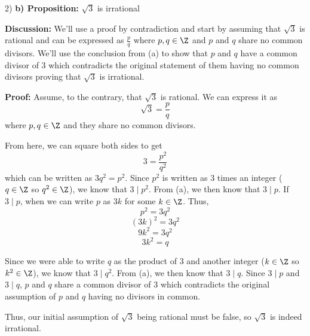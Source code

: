 \begin{paragraph}{2)}
        \textbf{b) Proposition:} $\sqrt{3}$ is irrational
        \spacing

        \textbf{Discussion:} We'll use a proof by contradiction and start
        by assuming that $\sqrt{3}$ is rational and can be expressed 
        as $\frac{p}{q}$ where $p, q \in \Z$ and $p$ and $q$ share no
        common divisors. We'll use the conclusion from (a) to show that 
        $p$ and $q$ have a common divisor of 3 which contradicts the original 
        statement of them having no common divisors proving that $\sqrt{3}$
        is irrational.
        \spacing

        \textbf{Proof:} Assume, to the contrary, that $\sqrt{3}$ is rational. We
        can express it as $$\sqrt{3} = \frac{p}{q}$$ where 
        $p, q \in \Z$ and they share no common divisors. 
        \spacing
        
        From here, we can square both sides to get $$3 = \frac{p^2}{q^2}$$ which can
        be written as $3q^2 = p^2$. Since $p^2$ is written as $3$ times
        an integer ($q \in \Z$ so $q^2 \in \Z$), we know that $3 \mid p^2$.
        From (a), we then know that $3 \mid p$. If $3 \mid p$, when we can write 
        $p$ as $3k$ for some $k \in \Z$. Thus,
        $$p^2 = 3q^2$$
        $$(3k)^2 = 3q^2$$
        $$9k^2 = 3q^2$$
        $$3k^2 = q$$

        Since we were able to write $q$ as the product of $3$ and 
        another integer ($k \in \Z$ so $k^2 \in \Z$), we know that 
        $3 \mid q^2$. From (a), we then know that $3 \mid q$. Since 
        $3 \mid p$ and $3 \mid q$, $p$ and $q$ share a common divisor of 3
        which contradicts the original assumption of $p$ and $q$ having
        no divisors in common. 
        \spacing

        Thus, our initial assumption of $\sqrt{3}$ being rational must 
        be false, so $\sqrt{3}$ is indeed irrational. 
        \proofEnd
    \end{paragraph}

    \bigskip

